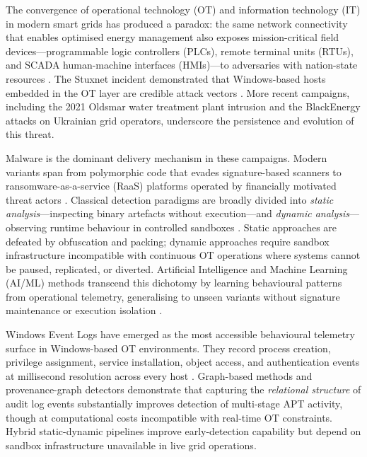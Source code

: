 \label{sec:intro}

The convergence of operational technology (OT) and information technology (IT) in modern
smart grids has produced a paradox: the same network connectivity that enables optimised
energy management also exposes mission-critical field devices—programmable logic controllers
(PLCs), remote terminal units (RTUs), and SCADA human-machine interfaces (HMIs)—to
adversaries with nation-state resources \cite{nafees2023}. The Stuxnet incident demonstrated
that Windows-based hosts embedded in the OT layer are credible attack vectors
\cite{langner2011stuxnet}. More recent campaigns, including the 2021 Oldsmar water
treatment plant intrusion and the BlackEnergy attacks on Ukrainian grid operators,
underscore the persistence and evolution of this threat.

Malware is the dominant delivery mechanism in these campaigns. Modern variants span from
polymorphic code that evades signature-based scanners to ransomware-as-a-service (RaaS)
platforms operated by financially motivated threat actors \cite{maniriho2024}. Classical
detection paradigms are broadly divided into \emph{static analysis}—inspecting binary
artefacts without execution—and \emph{dynamic analysis}—observing runtime behaviour in
controlled sandboxes \cite{ayub2023}. Static approaches are defeated by obfuscation and
packing; dynamic approaches require sandbox infrastructure incompatible with continuous OT
operations where systems cannot be paused, replicated, or diverted. Artificial Intelligence
and Machine Learning (AI/ML) methods transcend this dichotomy by learning behavioural
patterns from operational telemetry, generalising to unseen variants without signature
maintenance or execution isolation \cite{onal2025}.

Windows Event Logs have emerged as the most accessible behavioural telemetry surface in
Windows-based OT environments. They record process creation, privilege assignment, service
installation, object access, and authentication events at millisecond resolution across
every host \cite{achmad2025}. Graph-based methods \cite{zhen2025} and provenance-graph
detectors \cite{han2020} demonstrate that capturing the \emph{relational structure} of
audit log events substantially improves detection of multi-stage APT activity, though at
computational costs incompatible with real-time OT constraints. Hybrid static-dynamic
pipelines \cite{ayub2023,anderson2018} improve early-detection capability but depend on
sandbox infrastructure unavailable in live grid operations.

